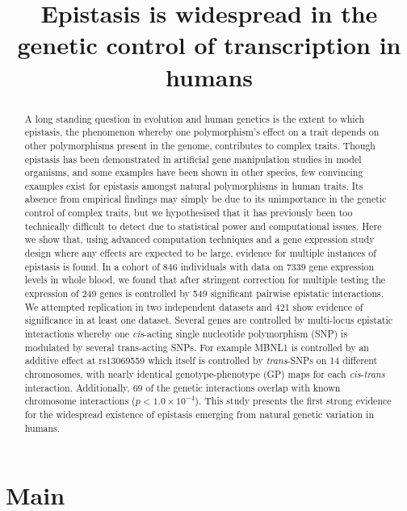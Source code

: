 \documentclass{article}
\title{Epistasis is widespread in the genetic control of transcription in humans}
\begin{document}
\maketitle


\begin{abstract}
A long standing question in evolution and human genetics is the extent to which epistasis, the phenomenon whereby one polymorphism's effect on a trait depends on other polymorphisms present in the genome, contributes to complex traits. Though epistasis has been demonstrated in artificial gene manipulation studies in model organisms, and some examples have been shown in other species, few convincing examples exist for epistasis amongst natural polymorphisms in human traits. Its absence from empirical findings may simply be due to its unimportance in the genetic control of complex traits, but we hypothesised that it has previously been too technically difficult to detect due to statistical power and computational issues. Here we show that, using advanced computation techniques and a gene expression study design where any effects are expected to be large, evidence for multiple instances of epistasis is found. In a cohort of 846 individuals with data on 7339 gene expression levels in whole blood, we found that after stringent correction for multiple testing the expression of 249 genes is controlled by 549 significant pairwise epistatic interactions. We attempted replication in two independent datasets and 421 show evidence of significance in at least one dataset. Several genes are controlled by multi-locus epistatic interactions whereby one \emph{cis}-acting single nucleotide polymorphism (SNP) is modulated by several trans-acting SNPs. For example MBNL1 is controlled by an additive effect at rs13069559 which itself is controlled by \emph{trans}-SNPs on 14 different chromosomes, with nearly identical genotype-phenotype (GP) maps for each \emph{cis}-\emph{trans} interaction. Additionally, 69 of the genetic interactions overlap with known chromosome interactions ($p < 1.0 \times 10^{-4}$). This study presents the first strong evidence for the widespread existence of epistasis emerging from natural genetic variation in humans.
\end{abstract}


\section{Main}
\end{document}
